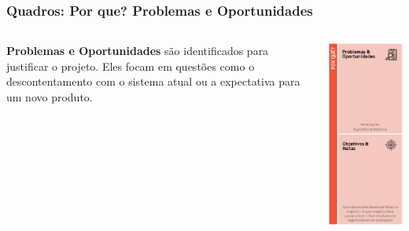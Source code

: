 \documentclass[aspectratio=169]{beamer}
\begin{document}
\begin{frame}
\frametitle{Quadros: Por que? Problemas e Oportunidades}
\begin{columns}
        \begin{column}{.66\textwidth}
            \textbf{Problemas e Oportunidades} são identificados para justificar o projeto. Eles focam em questões como o descontentamento com o sistema atual ou a expectativa para um novo produto.
        \end{column}
        \begin{column}{.33\textwidth}
\includegraphics[height=0.7\textheight]{detalhes/Porque.png} %
        \end{column}
    \end{columns}
\end{frame}
\end{document}
